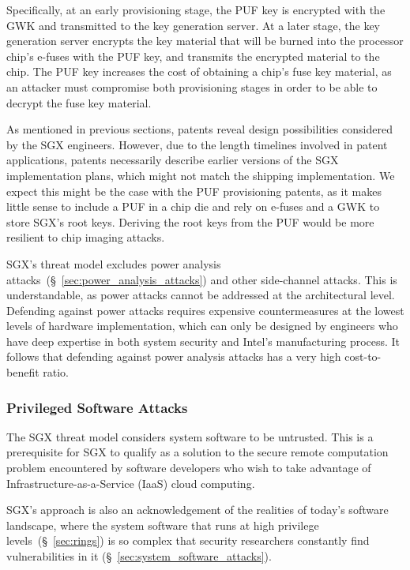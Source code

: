 Specifically, at an early provisioning stage, the PUF key is encrypted with the
GWK and transmitted to the key generation server. At a later stage, the key
generation server encrypts the key material that will be burned into the
processor chip's e-fuses with the PUF key, and transmits the encrypted material
to the chip. The PUF key increases the cost of obtaining a chip's fuse key
material, as an attacker must compromise both provisioning stages in order to
be able to decrypt the fuse key material.

As mentioned in previous sections, patents reveal design possibilities
considered by the SGX engineers. However, due to the length timelines involved
in patent applications, patents necessarily describe earlier versions of the
SGX implementation plans, which might not match the shipping implementation. We
expect this might be the case with the PUF provisioning patents, as it makes
little sense to include a PUF in a chip die and rely on e-fuses and a GWK to
store SGX's root keys. Deriving the root keys from the PUF would be more
resilient to chip imaging attacks.

SGX's threat model excludes power analysis
attacks~(\S~\ref{sec:power_analysis_attacks}) and other side-channel attacks.
This is understandable, as power attacks cannot be addressed at the
architectural level. Defending against power attacks requires expensive
countermeasures at the lowest levels of hardware implementation, which can only
be designed by engineers who have deep expertise in both system security and
Intel's manufacturing process. It follows that defending against power analysis
attacks has a very high cost-to-benefit ratio.


\subsubsection{Privileged Software Attacks}
\label{sec:sgx_vs_privileged_sw_attacks}

The SGX threat model considers system software to be untrusted. This is a
prerequisite for SGX to qualify as a solution to the secure remote computation
problem encountered by software developers who wish to take advantage of
Infrastructure-as-a-Service (IaaS) cloud computing.

SGX's approach is also an acknowledgement of the realities of today's software
landscape, where the system software that runs at high privilege
levels~(\S~\ref{sec:rings}) is so complex that security researchers constantly
find vulnerabilities in it (\S~\ref{sec:system_software_attacks}).

